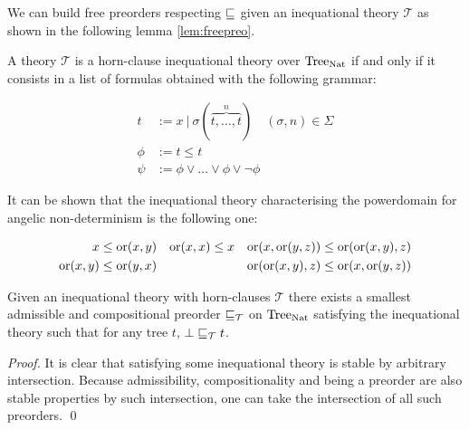 We can build free preorders respecting $\sqsubseteq$
given an inequational theory $\mathcal{T}$ as shown
in the following lemma \ref{lem:freepreo}.

\begin{adefinition}
    A theory $\mathcal{T}$ is a horn-clause inequational 
    theory over $\textnormal{Tree}_{\textnormal{Nat}}$ if and only if it consists 
    in a list of formulas obtained with the following grammar:

    \begin{align*}
        t    &:= x ~|~ \sigma (\overbrace{t,\dots,t}^n) \quad (\sigma,n) \in
        \Sigma\\
        \phi &:= t \leq t \\
        \psi &:= \phi \vee \dots \vee \phi \vee \neg \phi
    \end{align*}
\end{adefinition}

\begin{example}
    It can be shown that the inequational theory 
    characterising the powerdomain for angelic 
    non-determinism is the following one:

    \begin{align*}
        x \leq \operatorname{or} (x,y) & & \operatorname{or} (x,x) \leq x & & \operatorname{or} (x,\operatorname{or} (y,z))
        \leq \operatorname{or}(\operatorname{or} (x,y),z) \\
        \operatorname{or} (x,y) \leq \operatorname{or}(y,x) & & & & \operatorname{or}(\operatorname{or} (x,y),z) \leq \operatorname{or}
        (x,\operatorname{or} (y,z))
    \end{align*}
\end{example}

\begin{alemma}
    \label{lem:freepreo}
    Given an inequational theory with horn-clauses $\mathcal{T}$
    there exists a smallest admissible 
    and compositional preorder $\sqsubseteq_\mathcal{T}$ 
    on $\textnormal{Tree}_{\textnormal{Nat}}$ satisfying the inequational theory 
    such that for any tree $t$, $\bot \sqsubseteq_\mathcal{T} t$.
\end{alemma}

\begin{proof}
    It is clear that satisfying some inequational 
    theory is stable by arbitrary intersection. Because 
    admissibility, compositionality and being 
    a preorder are also 
    stable properties by such intersection, one 
    can take the intersection of all such preorders.
\qed\end{proof}
